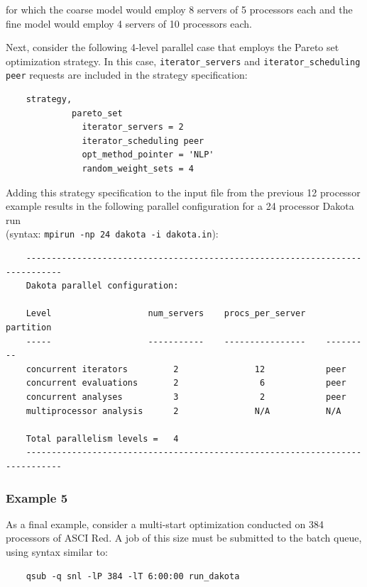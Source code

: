 for which the coarse model would employ 8 servers of 5 processors each
and the fine model would employ 4 servers of 10 processors each.

Next, consider the following 4-level parallel case that employs the
Pareto set optimization strategy. In this case,
\texttt{iterator\_servers} and \texttt{iterator\_scheduling peer}
requests are included in the strategy specification:
\begin{small}
\begin{verbatim}
    strategy,
             pareto_set
               iterator_servers = 2
               iterator_scheduling peer
               opt_method_pointer = 'NLP'
               random_weight_sets = 4
\end{verbatim}
\end{small}

Adding this strategy specification to the input file from the previous
12 processor example results in the following parallel configuration
for a 24 processor Dakota run \\
(syntax: \texttt{mpirun -np 24 dakota -i dakota.in}):
\begin{small}
\begin{verbatim}
    -----------------------------------------------------------------------------
    Dakota parallel configuration:

    Level                   num_servers    procs_per_server    partition
    -----                   -----------    ----------------    ---------
    concurrent iterators         2               12            peer
    concurrent evaluations       2                6            peer
    concurrent analyses          3                2            peer
    multiprocessor analysis      2               N/A           N/A

    Total parallelism levels =   4
    -----------------------------------------------------------------------------
\end{verbatim}
\end{small}

\subsubsection{Example 5}\label{parallel:spec:multi:example5}

As a final example, consider a multi-start optimization conducted on
384 processors of ASCI Red. A job of this size must be submitted to
the batch queue, using syntax similar to:
\begin{small}
\begin{verbatim}
    qsub -q snl -lP 384 -lT 6:00:00 run_dakota
\end{verbatim}
\end{small}

